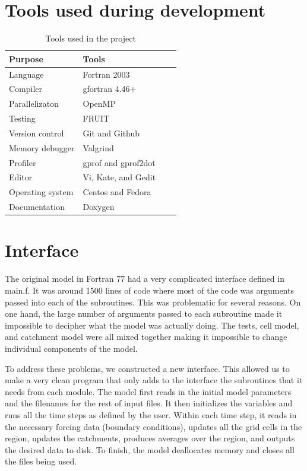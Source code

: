 \documentclass[pdftex,12pt,a4paper]{article}
\begin{document}
\section{Tools used during development}
\begin{table}[ht]
  \begin{center}
    \caption{Tools used in the project}
    \begin{tabular}{ | l | l | l | p{5cm} |}
    \hline
    Purpose & Tools \\ \hline
    Language & Fortran 2003 \\
    Compiler & gfortran 4.46+ \\
    Parallelizaton & OpenMP \\
    Testing & FRUIT \\ 
    Version control & Git and Github \\ 
    Memory debugger & Valgrind \\ 
    Profiler & gprof and gprof2dot\\ 
    Editor & Vi, Kate, and Gedit \\
    Operating system & Centos and Fedora \\
    Documentation & Doxygen \\ \hline
    \end{tabular}
  \end{center}
\end{table}

\section{Interface}
The original model in Fortran 77 had a very complicated interface defined in main.f. It was around 1500 lines of code where most of the code was arguments passed into each of the subroutines. This was problematic for several reasons. On one hand, the large number of arguments passed to each subroutine made it impossible to decipher what the model was actually doing. The tests, cell model, and catchment model were all mixed together making it impossible to change individual components of the model. 

To address these problems, we constructed a new interface. This allowed us to make a very clean program that only adds to the interface the subroutines that it needs from each module. The model first reads in the initial model parameters and the filenames for the rest of input files. It then initializes the variables and runs all the time steps as defined by the user. Within each time step, it reads in the necessary forcing data (boundary conditions), updates all the grid cells in the region, updates the catchments, produces averages over the region, and outputs the desired data to disk. To finish, the model deallocates memory and closes all the files being used. 
\end{document}
